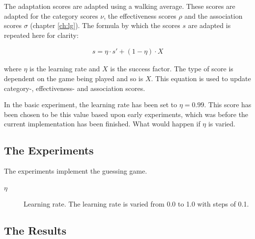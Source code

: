 The adaptation scores are adapted using a walking average. These scores are adapted for the category scores $\nu$, the effectiveness scores $\rho$ and the association scores $\sigma$ (chapter \ref{ch:lg}). The formula by which the scores $s$ are adapted is repeated here for clarity:

\begin{eqnarray}
s = \eta \cdot s' + (1-\eta)\cdot X
\end{eqnarray}


where $\eta$ is the learning rate and $X$ is the success factor. The type of score is dependent on the game being played and so is $X$. This equation is used to update category-, effectiveness- and association scores.

In the basic experiment, the learning rate has been set to $\eta=0.99$. This score has been chosen to be this value based upon early experiments, which was before the current implementation has been finished. What would happen if $\eta$ is varied.

\subsection{The Experiments}

The experiments implement the guessing game.

\begin{description}
\item[$\eta$] Learning rate. The learning rate is varied from 0.0 to 1.0 with steps of 0.1.
\end{description}

\subsection{The Results}

